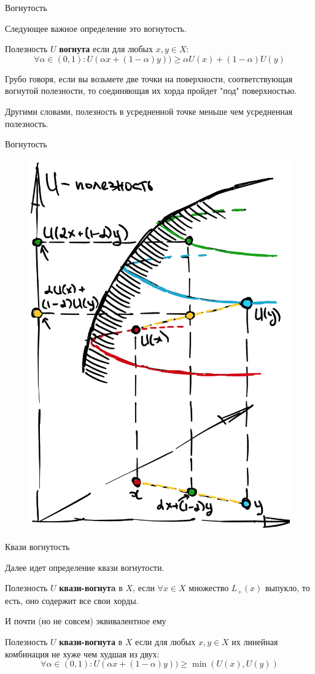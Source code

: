 \documentclass{beamer}
\begin{document}
\begin{frame}{Вогнутость}

Следующее важное определение это вогнутость.

\begin{definition}
Полезность $U$ \textbf{вогнута} если для любых $x, y \in X$: 
$$ \forall \alpha \in (0,1): U(\alpha x + (1-\alpha) y)) \geqslant \alpha U(x) + (1-\alpha) U(y)$$
\end{definition}

Грубо говоря, если вы возьмете две точки на поверхности, соответствующая вогнутой полезности, то соединяющая их хорда пройдет "под" поверхностью. 

Другими словами, полезность в усредненной точке меньше чем усредненная полезность.

\end{frame}

\begin{frame}{Вогнутость}

\begin{figure}[hbt]
\centering
\includegraphics[width=.5 \textwidth]{concave.png}
\end{figure}

\end{frame}

\begin{frame}{Квази вогнутость}

Далее идет определение квази вогнутости.

\begin{definition}
Полезность $U$ \textbf{квази-вогнутa} в $X$, если $\forall x \in X$ множество $L_{+}(x)$ выпукло, то есть, оно содержит все свои хорды. 
\end{definition}

И почти (но не совсем) эквивалентное ему

\begin{definition}
Полезность $U$ \textbf{квази-вогнута} в $X$ если для любых $x, y \in X$ их линейная комбинация не хуже чем худшая из двух:
$$ \forall \alpha \in (0,1): U(\alpha x + (1-\alpha) y)) \geqslant \min(U(x), U(y))$$

\end{definition}

\end{frame}
\end{document}
